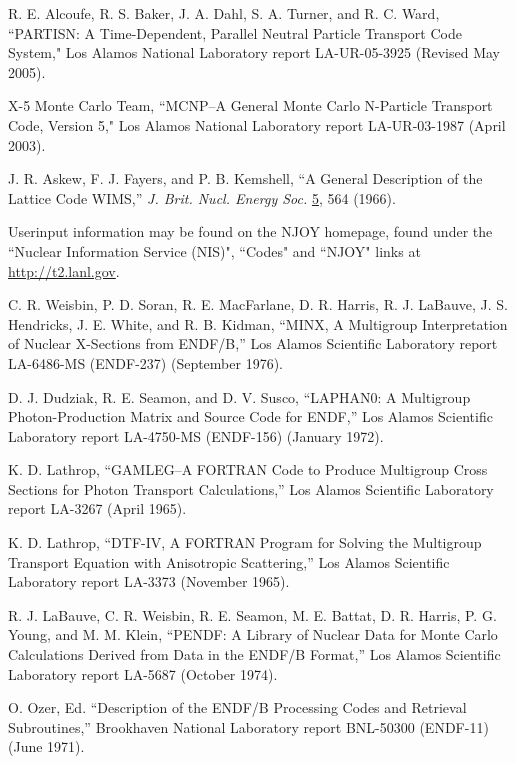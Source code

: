 \documentclass[11pt,twoside]{NJOYMan}
\begin{document}
\begin{thebibliography}{99}
\begin{singlespace}
 R. E. Alcoufe, R. S. Baker, J. A. Dahl, S. A. Turner,
  and R. C. Ward, ``PARTISN: A Time-Dependent, Parallel Neutral Particle
  Transport Code System," Los Alamos National Laboratory report
  LA-UR-05-3925 (Revised May 2005).

 X-5 Monte Carlo Team, ``MCNP--A General Monte Carlo
  N-Particle Transport Code, Version 5," Los Alamos National
  Laboratory report LA-UR-03-1987 (April 2003).

 J. R. Askew, F. J. Fayers, and P. B. Kemshell,
  ``A General Description of the Lattice Code WIMS,''
  {\it J. Brit. Nucl. Energy Soc.} \underline{5}, 564 (1966).

 Userinput information may be found on
 the NJOY homepage, found under the ``Nuclear Information
 Service (NIS)", ``Codes" and ``NJOY" links at
 \href{http://t2.lanl.gov}{http://t2.lanl.gov}.

 C. R. Weisbin, P. D. Soran, R. E. MacFarlane,
  D. R. Harris, R. J. LaBauve, J. S. Hendricks, J. E. White,
  and R. B. Kidman, ``MINX, A Multigroup Interpretation of
  Nuclear X-Sections from ENDF/B,'' Los Alamos Scientific
  Laboratory report LA-6486-MS (ENDF-237) (September 1976).

 D. J. Dudziak, R. E. Seamon, and D. V. Susco,
  ``LAPHAN0:  A Multigroup Photon-Production Matrix and Source
  Code for ENDF,'' Los Alamos Scientific Laboratory report
  LA-4750-MS (ENDF-156) (January 1972).

 K. D. Lathrop, ``GAMLEG--A FORTRAN Code to
  Produce Multigroup Cross Sections for Photon Transport Calculations,''
  Los Alamos Scientific Laboratory report LA-3267 (April 1965).

 K. D. Lathrop, ``DTF-IV, A FORTRAN Program for
  Solving the Multigroup Transport Equation with Anisotropic
  Scattering,'' Los Alamos Scientific Laboratory report
  LA-3373 (November 1965).

 R. J. LaBauve, C. R. Weisbin, R. E. Seamon,
  M. E. Battat, D. R. Harris, P. G. Young, and M. M. Klein,
  ``PENDF: A Library of Nuclear Data for Monte Carlo
  Calculations Derived from Data in the ENDF/B Format,''
  Los Alamos Scientific Laboratory report LA-5687 (October 1974).

 O. Ozer, Ed. ``Description of the ENDF/B
  Processing Codes and Retrieval Subroutines,'' Brookhaven
  National Laboratory report BNL-50300 (ENDF-11) (June 1971).


\end{singlespace}
\end{thebibliography}
\end{document}

